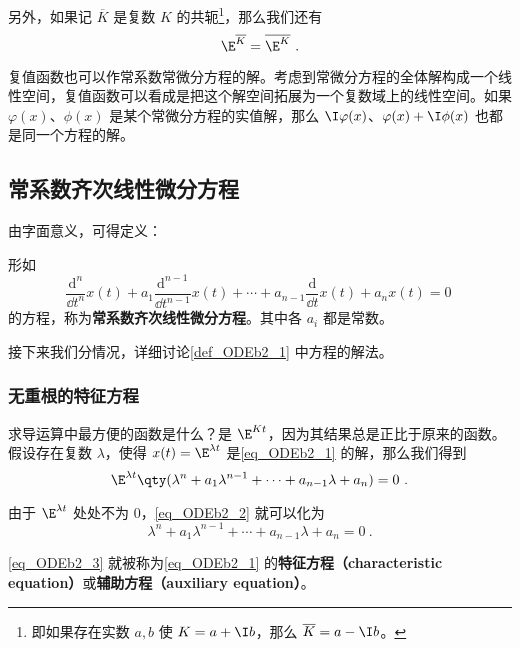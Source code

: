 另外，如果记 $\overline{K}$ 是复数 $K$ 的共轭\footnote{即如果存在实数 $a, b$ 使 $K=a+\I b$，那么 $\overline{K}=a-\I b$。}，那么我们还有
\begin{equation}
\E^{\overline{K}}=\overline{\E^K}~.
\end{equation}

复值函数也可以作常系数常微分方程的解。考虑到常微分方程的全体解构成一个线性空间，复值函数可以看成是把这个解空间拓展为一个复数域上的线性空间。如果 $\varphi(x)$、$\phi(x)$ 是某个常微分方程的实值解，那么 $\I\varphi(x)$、$\varphi(x)+\I \phi(x)$ 也都是同一个方程的解。


\subsection{常系数齐次线性微分方程}



由字面意义，可得定义：
\begin{definition}{}\label{def_ODEb2_1}
形如
\begin{equation}\label{eq_ODEb2_1}
\frac{\mathrm{d}^n}{\dd t^n}x(t)+a_1\frac{\mathrm{d}^{n-1}}{\dd t^{n-1}}x(t)+\cdots+a_{n-1}\frac{\mathrm{d}}{\dd t}x(t)+a_nx(t)=0~
\end{equation}
的方程，称为\textbf{常系数齐次线性微分方程}。其中各 $a_i$ 都是常数。
\end{definition}

接下来我们分情况，详细讨论\autoref{def_ODEb2_1} 中方程的解法。

\subsubsection{无重根的特征方程}


求导运算中最方便的函数是什么？是 $\E^{Kt}$，因为其结果总是正比于原来的函数。假设存在复数 $\lambda$，使得 $x(t)=\E^{\lambda t}$ 是\autoref{eq_ODEb2_1} 的解，那么我们得到
\begin{equation}\label{eq_ODEb2_2}
\E^{\lambda t}\qty(\lambda^n+a_1\lambda^{n-1}+\cdots+a_{n-1}\lambda+a_n)=0~.
\end{equation}

由于 $\E^{\lambda t}$ 处处不为 $0$，\autoref{eq_ODEb2_2} 就可以化为
\begin{equation}\label{eq_ODEb2_3}
\lambda^n+a_1\lambda^{n-1}+\cdots+a_{n-1}\lambda+a_n=0~.
\end{equation}

\autoref{eq_ODEb2_3} 就被称为\autoref{eq_ODEb2_1} 的\textbf{特征方程（characteristic equation）}或\textbf{辅助方程（auxiliary equation）}。


